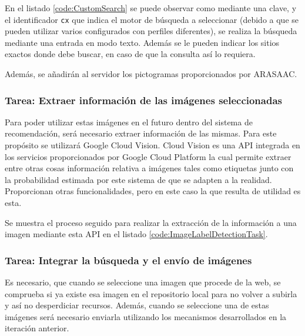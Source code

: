 En el listado \ref{code:CustomSearch} se puede observar como mediante una clave, y el identificador \texttt{cx} que indica el motor de búsqueda a seleccionar (debido a que se pueden utilizar varios configurados con perfiles diferentes), se realiza la búsqueda mediante una entrada en modo texto. Además se le pueden indicar los sitios exactos donde debe buscar, en caso de que la consulta así lo requiera.



Además, se añadirán al servidor los pictogramas proporcionados por ARASAAC.

\subsubsection{Tarea: Extraer información de las imágenes seleccionadas}

Para poder utilizar estas imágenes en el futuro dentro del sistema de recomendación, será necesario extraer información de las mismas. Para este propósito se utilizará Google Cloud Vision. Cloud Vision es una \ac{API} integrada en los servicios proporcionados por Google Cloud Platform la cual permite extraer entre otras cosas información relativa a imágenes tales como etiquetas junto con la probabilidad estimada por este sistema de que se adapten a la realidad. Proporcionan otras funcionalidades, pero en este caso la que resulta de utilidad es esta.

Se  muestra el proceso seguido para realizar la extracción de la información a una imagen mediante esta \ac{API} en el listado \ref{code:ImageLabelDetectionTask}.



\subsubsection{Tarea: Integrar la búsqueda y el envío de imágenes}

Es necesario, que cuando se seleccione una imagen que procede de la web, se comprueba si ya existe esa imagen en el repositorio local para no volver a subirla y así no desperdiciar recursos. Además, cuando se seleccione una de estas imágenes será necesario enviarla utilizando los mecanismos desarrollados en la iteración anterior.

